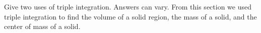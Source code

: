 {Give two uses of triple integration.
}
{Answers can vary. From this section we used triple integration to find the volume of a solid region, the mass of a solid, and the center of mass of a solid.
}
